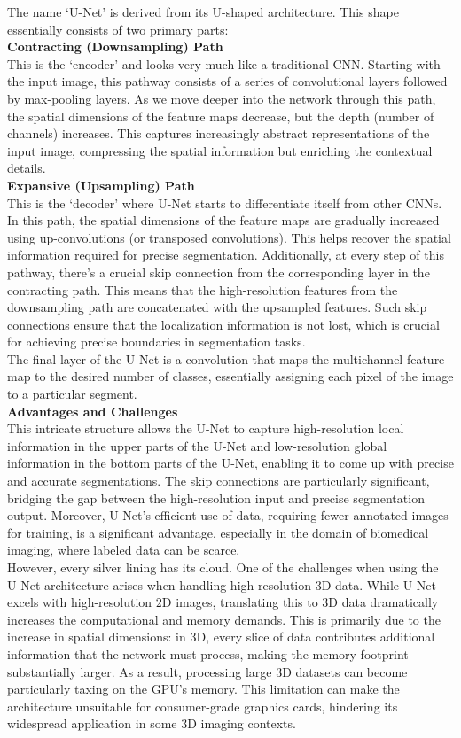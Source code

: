 \noindent The name `U-Net' is derived from its U-shaped architecture.
This shape essentially consists of two primary parts:\\[1ex]
\noindent\textbf{Contracting (Downsampling) Path}\\
This is the `encoder' and looks very much like a traditional CNN.
Starting with the input image, this pathway consists of a series of convolutional layers followed by max-pooling layers.
As we move deeper into the network through this path,
the spatial dimensions of the feature maps decrease, but the depth (number of channels) increases.
This captures increasingly abstract representations of the input image,
compressing the spatial information but enriching the contextual details.\\[1ex]
\noindent\textbf{Expansive (Upsampling) Path}\\
This is the `decoder' where U-Net starts to differentiate itself from other CNNs.
In this path, the spatial dimensions of the feature maps are gradually increased using up-convolutions
(or transposed convolutions). This helps recover the spatial information required for precise segmentation.
Additionally, at every step of this pathway, there's a crucial skip connection from the corresponding layer in the contracting path.
This means that the high-resolution features from the downsampling path are concatenated with the upsampled features.
Such skip connections ensure that the localization information is not lost,
which is crucial for achieving precise boundaries in segmentation tasks\cite[4]{ronneberger_u-net_2015}.\\[1ex]
The final layer of the U-Net is a convolution that maps the multichannel feature map to the desired number of classes, essentially assigning each pixel of the image to a particular segment.\\[1ex]
\textbf{Advantages and Challenges}\\
This intricate structure allows the U-Net to capture high-resolution local information in the upper parts of the U-Net and low-resolution global information in the bottom parts of the U-Net,
enabling it to come up with precise and accurate segmentations. The skip connections are particularly significant, bridging the gap between the high-resolution input and precise segmentation output.
Moreover, U-Net's efficient use of data, requiring fewer annotated images for training, is a significant advantage, especially in the domain of biomedical imaging, where labeled data can be scarce.\\[1ex]
However, every silver lining has its cloud. One of the challenges when using the U-Net architecture arises when handling high-resolution $3$D data. While U-Net excels with high-resolution $2$D images,
translating this to $3$D data dramatically increases the computational and memory demands. This is primarily due to the increase in spatial dimensions: in $3$D,
every slice of data contributes additional information that the network must process, making the memory footprint substantially larger. As a result,
processing large $3$D datasets can become particularly taxing on the GPU's memory. This limitation can make the architecture unsuitable for consumer-grade graphics cards,
hindering its widespread application in some $3$D imaging contexts.

